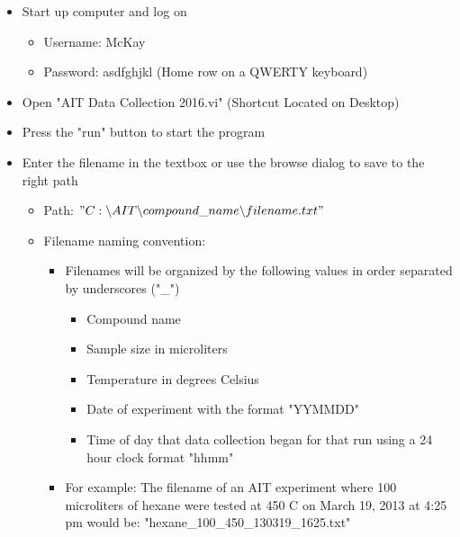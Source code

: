 \documentclass[letterpaper,11pt]{article}
\begin{document}
    \begin{itemize}
    \item Start up computer and log on
    
        \begin{itemize}
        \item Username: McKay
        \item Password: asdfghjkl (Home row on a QWERTY keyboard)
        \end{itemize}
        
    \item Open "AIT Data Collection 2016.vi" (Shortcut Located on Desktop)
    \item Press the "run" button to start the program
        
    \item Enter the filename in the textbox or use the browse dialog to save to 
        the right path
        
        \begin{itemize}
        \item Path: $"C:\backslash AIT\backslash compound\_name
            \backslash filename .txt"$
        
        \item Filename naming convention: 
            
            \begin{itemize}
            \item Filenames will be organized by the following values in order 
                separated by underscores ("\_")
                
                    \begin{itemize}
                    \item Compound name
                    \item Sample size in microliters
                    \item Temperature in degrees Celsius
                    \item Date of experiment with the format "YYMMDD"
                    \item Time of day that data collection began for that run
                        using a 24 hour clock format "hhmm"
                    \end{itemize}
                    
            \item For example: The filename of an AIT experiment where 100 
                microliters of hexane were tested at 450 \degree C on March 19, 
                2013 at 4:25 pm would be: "hexane\_100\_450\_130319\_1625.txt"
            \end{itemize}    
                

\end{itemize}
\end{itemize}
\end{document}
